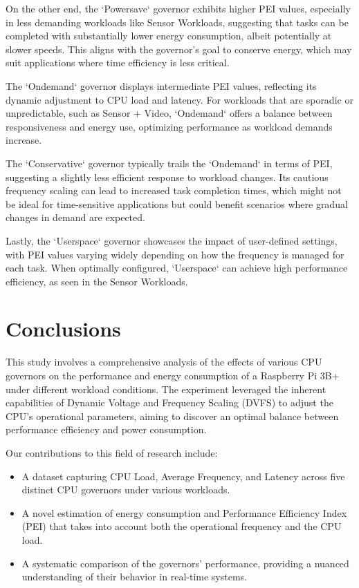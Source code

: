 \documentclass[conference]{IEEEtran}
\begin{document}
On the other end, the `Powersave` governor exhibits higher PEI values, especially in less demanding workloads like Sensor Workloads, suggesting that tasks can be completed with substantially lower energy consumption, albeit potentially at slower speeds. This aligns with the governor's goal to conserve energy, which may suit applications where time efficiency is less critical.

The `Ondemand` governor displays intermediate PEI values, reflecting its dynamic adjustment to CPU load and latency. For workloads that are sporadic or unpredictable, such as Sensor + Video, `Ondemand` offers a balance between responsiveness and energy use, optimizing performance as workload demands increase.

The `Conservative` governor typically trails the `Ondemand` in terms of PEI, suggesting a slightly less efficient response to workload changes. Its cautious frequency scaling can lead to increased task completion times, which might not be ideal for time-sensitive applications but could benefit scenarios where gradual changes in demand are expected.

Lastly, the `Userspace` governor showcases the impact of user-defined settings, with PEI values varying widely depending on how the frequency is managed for each task. When optimally configured, `Userspace` can achieve high performance efficiency, as seen in the Sensor Workloads.

\section{Conclusions}

This study involves a comprehensive analysis of the effects of various CPU governors on the performance and energy consumption of a Raspberry Pi 3B+ under different workload conditions. The experiment leveraged the inherent capabilities of Dynamic Voltage and Frequency Scaling (DVFS) to adjust the CPU's operational parameters, aiming to discover an optimal balance between performance efficiency and power consumption.

Our contributions to this field of research include:
\begin{itemize}
    \item A dataset capturing CPU Load, Average Frequency, and Latency across five distinct CPU governors under various workloads.
    \item A novel estimation of energy consumption and Performance Efficiency Index (PEI) that takes into account both the operational frequency and the CPU load.
    \item A systematic comparison of the governors' performance, providing a nuanced understanding of their behavior in real-time systems.
\end{itemize}
\end{document}
